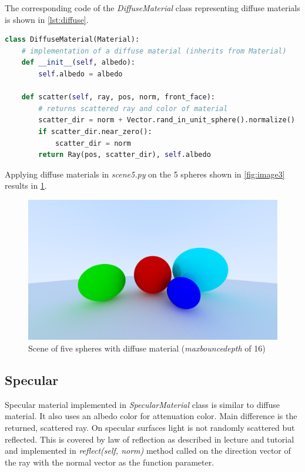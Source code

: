 \documentclass[]{article}
\begin{document}
		The corresponding code of the \emph{DiffuseMaterial} class representing diffuse materials is shown in \cref{lst:diffuse}.
		\begin{lstlisting}[caption={\emph{DiffuseMaterial} class}, language=Python, label=lst:diffuse]
class DiffuseMaterial(Material):
	# implementation of a diffuse material (inherits from Material)
	def __init__(self, albedo):
		self.albedo = albedo
	
	def scatter(self, ray, pos, norm, front_face):
		# returns scattered ray and color of material
		scatter_dir = norm + Vector.rand_in_unit_sphere().normalize()
		if scatter_dir.near_zero():
			scatter_dir = norm
		return Ray(pos, scatter_dir), self.albedo
		\end{lstlisting}
		
		Applying diffuse materials in \emph{scene5.py} on the 5 spheres shown in \cref{fig:image3} results in \cref{fig:image5}.
		
		\begin{figure}[h]
			\centering
			\includegraphics[width=0.9\linewidth]{image5-5}
			\caption{Scene of five spheres with diffuse material (\emph{max\textunderscore bounce\textunderscore depth} of 16)}
			\label{fig:image5}
		\end{figure}
		 
		\subsection{Specular}
		Specular material implemented in \emph{SpecularMaterial} class is similar to diffuse material. It also uses an albedo color for attenuation color. Main difference is the returned, scattered ray. On specular surfaces light is not randomly scattered but reflected. This is covered by law of reflection as described in lecture and tutorial and implemented in \emph{reflect(self, norm)} method called on the direction vector of the ray with the normal vector as the function parameter.
		
\end{document}
